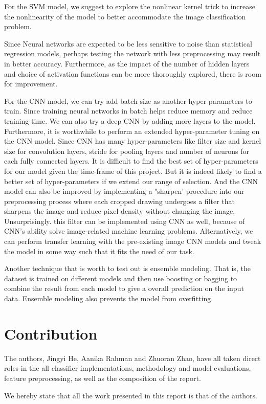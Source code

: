 \documentclass[conference]{IEEEtran}
\begin{document}
For the SVM model, we suggest to explore the nonlinear kernel trick to increase the nonlinearity of the model to better accommodate the image classification problem.

Since Neural networks are expected to be less sensitive to noise than statistical regression models, perhaps testing the network with less preprocessing may result in better accuracy. Furthermore, as the impact of the number of hidden layers and choice of activation functions can be more thoroughly explored, there is room for improvement. 

For the CNN model, we can try add batch size as another hyper parameters to train. Since training neural networks in batch helps reduce memory and reduce training time. We can also try a deep CNN by adding more layers to the model. Furthermore, it is worthwhile to perform an extended hyper-parameter tuning on the CNN model. Since CNN has many hyper-parameters like filter size and kernel size for convolution layers, stride for pooling layers and number of neurons for each fully connected layers. It is difficult to find the best set of hyper-parameters for our model given the time-frame of this project. But it is indeed likely to find a better set of hyper-parameters if we extend our range of selection. And the CNN model can also be improved by implementing a "sharpen' procedure into our preprocessing process where each cropped drawing undergoes a filter that sharpens the image and reduce pixel density without changing the image. Unsurprisingly. this filter can be implemented using CNN as well, because of CNN's ability solve image-related machine learning problems. Alternatively, we can perform transfer learning with the pre-existing image CNN models and tweak the model in some way such that it fits the need of our task.

Another technique that is worth to test out is ensemble modeling. That is, the dataset is trained on different models and then use boosting or bagging to combine the result from each model to give a overall prediction on the input data. Ensemble modeling also prevents the model from overfitting.


\section{Contribution} 
The authors, Jingyi He, Aanika Rahman and Zhuoran Zhao, have all taken direct roles in the all classifier implementations, methodology and model evaluations, feature preprocessing, as well as the composition of the report. 


We hereby state that all the work presented in this report is that of the authors.

\newpage



\end{document}
